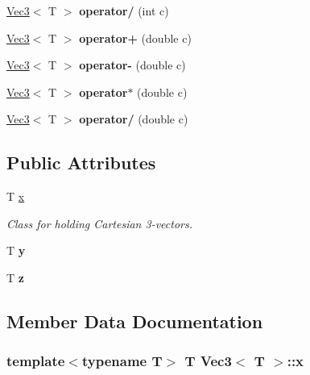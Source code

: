 \begin{DoxyCompactItemize}
\item 
\hypertarget{struct_vec3_ae31143d3d509e7ea6799a99b32afd47f}{\hyperlink{struct_vec3}{Vec3}$<$ T $>$ {\bfseries operator/} (int c)}\label{struct_vec3_ae31143d3d509e7ea6799a99b32afd47f}

\item 
\hypertarget{struct_vec3_a2f21a653eddec362cce38e1c2826b405}{\hyperlink{struct_vec3}{Vec3}$<$ T $>$ {\bfseries operator+} (double c)}\label{struct_vec3_a2f21a653eddec362cce38e1c2826b405}

\item 
\hypertarget{struct_vec3_a779da3dd5e1b75bd4c864dc4ff4e9107}{\hyperlink{struct_vec3}{Vec3}$<$ T $>$ {\bfseries operator-\/} (double c)}\label{struct_vec3_a779da3dd5e1b75bd4c864dc4ff4e9107}

\item 
\hypertarget{struct_vec3_a45b8b27bd10f374a7089232e774d8e21}{\hyperlink{struct_vec3}{Vec3}$<$ T $>$ {\bfseries operator$\ast$} (double c)}\label{struct_vec3_a45b8b27bd10f374a7089232e774d8e21}

\item 
\hypertarget{struct_vec3_a63138ccd40ce1c33d624de62ff597ee1}{\hyperlink{struct_vec3}{Vec3}$<$ T $>$ {\bfseries operator/} (double c)}\label{struct_vec3_a63138ccd40ce1c33d624de62ff597ee1}

\end{DoxyCompactItemize}
\subsection*{Public Attributes}
\begin{DoxyCompactItemize}
\item 
T \hyperlink{struct_vec3_aeba95c52e15a5a7476550c1798210db2}{x}
\begin{DoxyCompactList}\small\item\em Class for holding Cartesian 3-\/vectors. \end{DoxyCompactList}\item 
\hypertarget{struct_vec3_a76f06eaf078504ac1d09c910ddb24696}{T {\bfseries y}}\label{struct_vec3_a76f06eaf078504ac1d09c910ddb24696}

\item 
\hypertarget{struct_vec3_a0f694311f956380952aee054cbabb8b6}{T {\bfseries z}}\label{struct_vec3_a0f694311f956380952aee054cbabb8b6}

\end{DoxyCompactItemize}


\subsection{Member Data Documentation}
\hypertarget{struct_vec3_aeba95c52e15a5a7476550c1798210db2}{
\subsubsection[{x}]{\setlength{\rightskip}{0pt plus 5cm}template$<$typename T$>$ T {\bf Vec3}$<$ T $>$\+::x}}\label{struct_vec3_aeba95c52e15a5a7476550c1798210db2}


